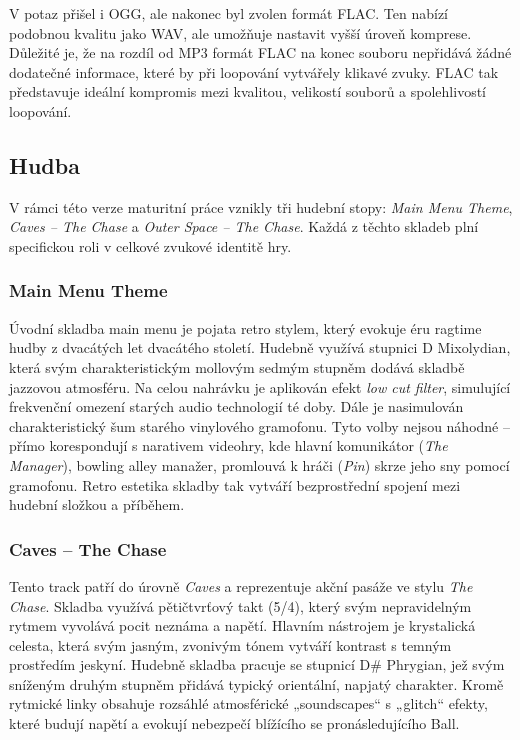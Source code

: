 V potaz přišel i OGG, ale nakonec byl zvolen formát FLAC. Ten nabízí podobnou kvalitu jako WAV, ale umožňuje nastavit vyšší úroveň komprese. Důležité je, že na rozdíl od MP3 formát FLAC na konec souboru nepřidává žádné dodatečné informace, které by při loopování vytvářely klikavé zvuky. FLAC tak představuje ideální kompromis mezi kvalitou, velikostí souborů a spolehlivostí loopování.

\subsection{Hudba}
\label{sec:hudba}

V rámci této verze maturitní práce vznikly tři hudební stopy: \emph{Main Menu Theme}, \emph{Caves -- The Chase} a \emph{Outer Space -- The Chase}. Každá z těchto skladeb plní specifickou roli v celkové zvukové identitě hry.

\subsubsection{Main Menu Theme}
Úvodní skladba main menu je pojata retro stylem, který evokuje éru ragtime hudby z dvacátých let dvacátého století. Hudebně využívá stupnici D Mixolydian, která svým charakteristickým mollovým sedmým stupněm dodává skladbě jazzovou atmosféru. Na celou nahrávku je aplikován efekt \emph{low cut filter}, simulující frekvenční omezení starých audio technologií té doby. Dále je nasimulován charakteristický šum starého vinylového gramofonu. Tyto volby nejsou náhodné -- přímo korespondují s narativem videohry, kde hlavní komunikátor (\emph{The Manager}), bowling alley manažer, promlouvá k hráči (\emph{Pin}) skrze jeho sny pomocí gramofonu. Retro estetika skladby tak vytváří bezprostřední spojení mezi hudební složkou a příběhem.

\subsubsection{Caves -- The Chase}
Tento track patří do úrovně \emph{Caves} a reprezentuje akční pasáže ve stylu \emph{The Chase}. Skladba využívá pětičtvrťový takt (5/4), který svým nepravidelným rytmem vyvolává pocit neznáma a napětí. Hlavním nástrojem je krystalická celesta, která svým jasným, zvonivým tónem vytváří kontrast s temným prostředím jeskyní. Hudebně skladba pracuje se stupnicí D\# Phrygian, jež svým sníženým druhým stupněm přidává typický orientální, napjatý charakter. Kromě rytmické linky obsahuje rozsáhlé atmosférické „soundscapes“ s „glitch“ efekty, které budují napětí a evokují nebezpečí blížícího se pronásledujícího Ball.

